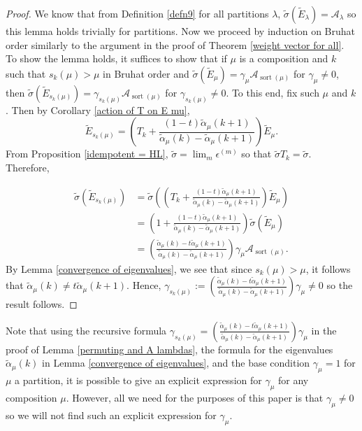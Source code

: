 \documentclass[ALCO,Unicode]{cedram}
\DeclareMathOperator{\sort}{sort}
\begin{document}
\begin{proof}

We know that from Definition \ref{defn9} for all partitions $\lambda$,  $\widetilde{\sigma}( \widetilde{E}_{\lambda} ) = \mathcal{A}_{\lambda}$ so this lemma holds trivially for partitions. Now we proceed by induction on Bruhat order similarly to the argument in the proof of Theorem \ref{weight vector for all}. To show the lemma holds, it suffices to show that if $\mu$ is a composition and $k$ such that $s_k(\mu) > \mu$ in Bruhat order and $\widetilde{\sigma}( \widetilde{E}_{\mu} ) = \gamma_{\mu} \mathcal{A}_{\sort(\mu)}$ for $\gamma_{\mu} \neq 0$, then $\widetilde{\sigma}( \widetilde{E}_{s_k(\mu)} ) = \gamma_{s_k(\mu)} \mathcal{A}_{\sort(\mu)}$ for $\gamma_{s_k(\mu)} \neq 0$. To this end, fix such $\mu$ and $k$. Then by Corollary \ref{action of T on E mu},
$$\widetilde{E}_{s_k(\mu)} = \left( T_k + \frac{(1-t)\widetilde{\alpha}_{\mu}(k+1)}{\widetilde{\alpha}_{\mu}(k)- \widetilde{\alpha}_{\mu}(k+1)}\right) \widetilde{E}_{\mu}.$$
From Proposition \ref{idempotent = HL}, $\widetilde{\sigma} = \lim_{m} \epsilon^{(m)}$ so that $\widetilde{\sigma}T_k = \widetilde{\sigma}$. Therefore, 

\begin{align*}
    \widetilde{\sigma}(\widetilde{E}_{s_k(\mu)})&= \widetilde{\sigma}\left( \left( T_k + \frac{(1-t)\widetilde{\alpha}_{\mu}(k+1)}{\widetilde{\alpha}_{\mu}(k)- \widetilde{\alpha}_{\mu}(k+1)}\right) \widetilde{E}_{\mu} \right) \\
    &= \left(1+ \frac{(1-t)\widetilde{\alpha}_{\mu}(k+1)}{\widetilde{\alpha}_{\mu}(k)- \widetilde{\alpha}_{\mu}(k+1)} \right) \widetilde{\sigma}(\widetilde{E}_{\mu}) \\
    &= \left( \frac{\widetilde{\alpha}_{\mu}(k) - t \widetilde{\alpha}_{\mu}(k+1)}{\widetilde{\alpha}_{\mu}(k) - \widetilde{\alpha}_{\mu}(k+1)} \right) \gamma_{\mu} \mathcal{A}_{\sort(\mu)}.
\end{align*}
By Lemma \ref{convergence of eigenvalues}, we see that since $s_k(\mu) > \mu$, it follows that $\widetilde{\alpha}_{\mu}(k) \neq t \widetilde{\alpha}_{\mu}(k+1).$
Hence, $\gamma_{s_k(\mu)} := \left( \frac{\widetilde{\alpha}_{\mu}(k) - t \widetilde{\alpha}_{\mu}(k+1)}{\widetilde{\alpha}_{\mu}(k) - \widetilde{\alpha}_{\mu}(k+1)} \right) \gamma_{\mu} \neq 0$ so the result follows.
\end{proof}

\begin{rema}
    Note that using the recursive formula $\gamma_{s_k(\mu)} = \left( \frac{\widetilde{\alpha}_{\mu}(k) - t \widetilde{\alpha}_{\mu}(k+1)}{\widetilde{\alpha}_{\mu}(k) - \widetilde{\alpha}_{\mu}(k+1)} \right) \gamma_{\mu}$ in the proof of Lemma \ref{permuting and A lambdas}, the formula for the eigenvalues $\widetilde{\alpha}_{\mu}(k)$ in Lemma \ref{convergence of eigenvalues}, and the base condition $\gamma_{\mu} = 1$ for $\mu$ a partition, it is possible to give an explicit expression for $\gamma_{\mu}$ for any composition $\mu.$ However, all we need for the purposes of this paper is that $\gamma_{\mu} \neq 0$ so we will not find such an explicit expression for $\gamma_{\mu}.$
\end{rema}
\end{document}
